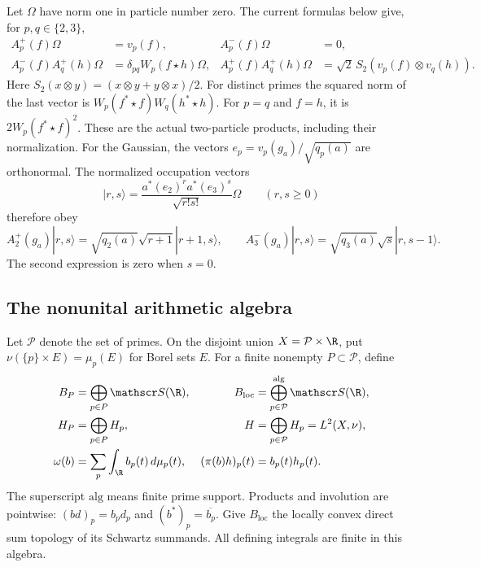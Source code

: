Let $\Omega$ have norm one in particle number zero.
The current formulas below give, for $p,q\in\{2,3\}$,
\begin{equation}
 \begin{aligned}
 A_p^+(f)\Omega&=v_p(f),& A_p^-(f)\Omega&=0,\\
 A_p^-(f)A_q^+(h)\Omega
 &=\delta_{pq}W_p(f\star h)\Omega,&
 A_p^+(f)A_q^+(h)\Omega
 &=\sqrt2\,S_2(v_p(f)\otimes v_q(h)).
 \end{aligned}
 \label{eq:wc-two-prime-action}
\end{equation}
Here $S_2(x\otimes y)=(x\otimes y+y\otimes x)/2$.
For distinct primes the squared norm of the last vector is
$W_p(f^*\star f)W_q(h^*\star h)$.
For $p=q$ and $f=h$, it is $2W_p(f^*\star f)^2$.
These are the actual two-particle products, including their normalization.
For the Gaussian, the vectors
$e_p=v_p(g_a)/\sqrt{q_p(a)}$ are orthonormal.
The normalized occupation vectors
\[
 |r,s\rangle=
 \frac{a^*(e_2)^r a^*(e_3)^s}{\sqrt{r!s!}}\Omega
 \qquad(r,s\geq0)
\]
therefore obey
\[
 A_2^+(g_a)|r,s\rangle
 =\sqrt{q_2(a)}\sqrt{r+1}|r+1,s\rangle,\qquad
 A_3^-(g_a)|r,s\rangle
 =\sqrt{q_3(a)}\sqrt{s}|r,s-1\rangle.
\]
The second expression is zero when $s=0$.

\subsection{The nonunital arithmetic algebra}

Let $\mathcal P$ denote the set of primes.  On the disjoint union
$X=\mathcal P\times\R$, put
$\nu(\{p\}\times E)=\mu_p(E)$ for Borel sets $E$.
For a finite nonempty $P\subset\mathcal P$, define
\begin{equation}
 \begin{aligned}
 B_P&=\bigoplus_{p\in P}\mathscr S(\R),&
 B_{\mathrm{loc}}&=\bigoplus_{p\in\mathcal P}^{\mathrm{alg}}\mathscr S(\R),\\
 H_P&=\bigoplus_{p\in P}H_p,&
 H&=\bigoplus_{p\in\mathcal P}H_p=L^2(X,\nu),\\
 \omega(b)&=\sum_p\int_\R b_p(t)\,d\mu_p(t),&
 (\pi(b)h)_p(t)&=b_p(t)h_p(t).
 \end{aligned}
 \label{eq:wc-local-algebra}
\end{equation}
The superscript $\mathrm{alg}$ means finite prime support.
Products and involution are pointwise:
$(bd)_p=b_pd_p$ and $(b^*)_p=\overline{b_p}$.
Give $B_{\mathrm{loc}}$ the locally convex direct sum topology of its
Schwartz summands.  All defining integrals are finite in this algebra.

